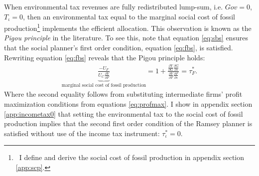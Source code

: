 When environmental tax revenues are fully redistributed lump-sum, i.e. $Gov=0$, $T_\iota=0$, then an environmental tax equal to the marginal social cost of fossil production\footnote{\ I define and derive the social cost of fossil production in appendix section \ref{app:scp}.} implements the efficient allocation. This observation is known as the \textit{Pigou principle} in the literature. 
To see this, note that equation \ref{eq:sbs} ensures that the social planner's first order condition, equation \ref{eq:fbs}, is satisfied. 
Rewriting equation \ref{eq:fbs} reveals that the Pigou principle holds: %
\begin{align}
\underbrace{\frac{-U_F}{U_C\frac{\partial Y}{\partial F}}}_{\text{marginal social cost of fossil production}}=1+\frac{\frac{\partial Y}{\partial G}\frac{\partial G}{\partial s}}{\frac{\partial Y}{\partial F}\frac{\partial F}{\partial s}}=\tau^*_F.
\end{align}
Where the second equality follows from substituting intermediate firms' profit maximization conditions from equations \ref{eq:profmax}. I show in appendix section \ref{app:incometax0} that setting the environmental tax to the social cost of fossil production implies that the second first order condition of the Ramsey planner is satisfied without use of the income tax instrument: $\tau_{\iota}^*=0$. %

